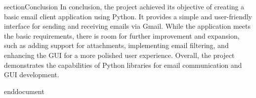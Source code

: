 section{Conclusion}
In conclusion, the project achieved its objective of creating a basic email client application using Python. It provides a simple and user-friendly interface for sending and receiving emails via Gmail. While the application meets the basic requirements, there is room for further improvement and expansion, such as adding support for attachments, implementing email filtering, and enhancing the GUI for a more polished user experience. Overall, the project demonstrates the capabilities of Python libraries for email communication and GUI development.

end{document}
